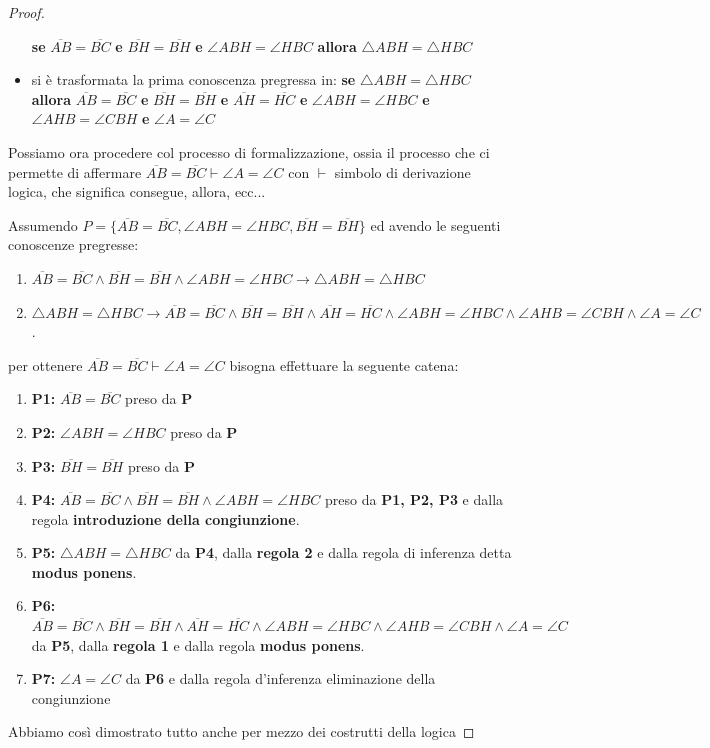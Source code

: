 \documentclass[a4paper]{report}
\begin{document}
\begin{proof}
\begin{itemize}
  \textbf{se} $\overline{AB}=\overline{BC}$ \textbf{e} $\overline{BH}=\overline{BH}$ \textbf{e} $\angle ABH = \angle HBC$
  \textbf{allora} $\triangle ABH=\triangle HBC$
\item si è trasformata la prima conoscenza pregressa in:\newline
  \textbf{se} $\triangle ABH=\triangle HBC$ \textbf{allora} $\overline{AB}=\overline{BC}$ \textbf{e} $\overline{BH}=\overline{BH}$
  \textbf{e} $\overline{AH}=\overline{HC}$ \textbf{e} $\angle ABH = \angle HBC$ \textbf{e} $\angle AHB = \angle CBH$ \textbf{e} $\angle A=\angle C$
\end{itemize}
Possiamo ora procedere col processo di formalizzazione, ossia il processo che ci permette di affermare
$\overline{AB} = \overline{BC} \vdash \angle A = \angle C$ con $\vdash$ simbolo di derivazione logica, che significa consegue, allora, ecc...

Assumendo $P = \{ \overline{AB} = \overline{BC}, \angle ABH = \angle HBC, \overline{BH} = \overline{BH} \}$
ed avendo le seguenti conoscenze pregresse:
\begin{enumerate}
\item $\overline{AB}=\overline{BC} \land \overline{BH}=\overline{BH} \land \angle ABH = \angle HBC \rightarrow \triangle ABH=\triangle HBC$
\item  $\triangle ABH=\triangle HBC \rightarrow \overline{AB}=\overline{BC} \land \overline{BH}=\overline{BH} \land \overline{AH}=\overline{HC}
        \land \angle ABH = \angle HBC \land \angle AHB = \angle CBH \land \angle A=\angle C$.
\end{enumerate}
per ottenere $\overline{AB} = \overline{BC} \vdash \angle A = \angle C$ bisogna effettuare la seguente catena:
\begin{enumerate}
\item \textbf{P1:} $\overline{AB}=\overline{BC}$ preso da \textbf{P}
\item \textbf{P2:} $\angle ABH = \angle HBC$ preso da \textbf{P}
\item \textbf{P3:} $\overline{BH}=\overline{BH}$ preso da \textbf{P}
\item \textbf{P4:} $\overline{AB} = \overline{BC} \land \overline{BH} = \overline{BH} \land \angle ABH = \angle HBC$ preso da \textbf{P1, P2, P3} e       dalla regola \textbf{introduzione della congiunzione}.
\item \textbf{P5:} $\triangle ABH = \triangle HBC$ da \textbf{P4}, dalla \textbf{regola 2}  e dalla regola di inferenza detta \textbf{modus ponens}.
\item \textbf{P6:} $\overline{AB} = \overline{BC} \land \overline{BH} = \overline{BH} \land \overline{AH} = \overline{HC} \land
  \angle ABH = \angle HBC \land \angle AHB = \angle CBH \land \angle A=\angle C$ da \textbf{P5}, dalla \textbf{regola 1} e dalla regola
  \textbf{modus ponens}.
\item \textbf{P7:} $\angle A=\angle C$ da \textbf{P6} e dalla regola d'inferenza eliminazione della congiunzione 
\end{enumerate}
Abbiamo così dimostrato tutto anche per mezzo dei costrutti della logica
\end{proof}
\end{document}
